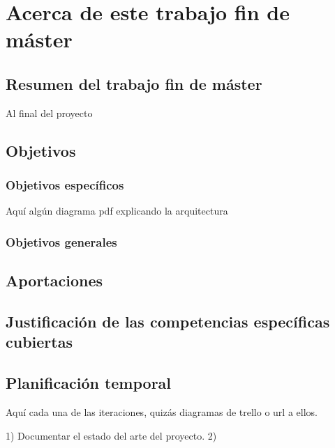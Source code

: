 \chapter{Acerca de este trabajo fin de máster}
\label{cha:introduction}


\section{Resumen del trabajo fin de máster}

Al final del proyecto

\section{Objetivos}

\subsection{Objetivos específicos}

Aquí algún diagrama pdf explicando la arquitectura

\subsection{Objetivos generales}

\section{Aportaciones}

\section{Justificación de las competencias específicas cubiertas}

\section{Planificación temporal}

Aquí cada una de las iteraciones, quizás diagramas de trello o url a ellos.

1) Documentar el estado del arte del proyecto.
2)


